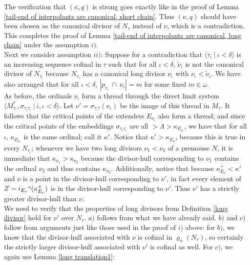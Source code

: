 \documentclass[12pt]{article}
\begin{document}
The verification that $( \kappa , q)$ is strong goes exactly like in the proof of Lemma \ref{tail-end of interpolants are canonical, short chain}.  Thus $(\kappa , q)$ should have been chosen as the canonical divisor of $N_\tau$ instead of $\nu$, which is a contradiction.  This completes the proof of Lemma \ref{tail-end of interpolants are canonical, long chain} under the assumption $i)$.\\


Next we consider assumption $ii)$: Suppose for a contradiction that $\langle \tau_\iota \ | \ \iota < \delta \rangle$ is an increasing sequence cofinal in $\tau$ such that for all $\iota < \delta$, $\tilde{\nu}_\iota$ is not the canonical divisor of $N_{\tau_\iota}$ because $N_{\tau_\iota}$ has a canonical long divisor $\nu_\iota$ with $\nu_\iota < \tilde{\nu}_\iota$.  We have also arranged that for all $\iota < \delta$, $|p_{\tau_\iota} \ \cap \ \nu_\iota| = m$ for some fixed $m \in \omega$.\\

As before, the ordinals $\nu_\iota$ form a thread through the direct limit system $\langle M^*_{\tau_\iota} , \sigma_{\tau_{\bar{\iota}} \tau_\iota} \ | \ \bar{\iota}, \iota < \delta \rangle$.  Let $\nu' = \sigma_{\tau_\iota \tau} (\nu_\iota)$ be the image of this thread in $M_\tau$.  It follows that the critical points of the extenders $E_{\nu_\iota}$ also form a thread; and since the critical points of the embeddings $\sigma_{\tau_{\bar{\iota}} \tau_\iota}$ are all $> \Lambda > \kappa_{E_{\nu_\iota}}$, we have that for all $\iota$, $\kappa_{E_{\nu_\iota}}$ is the same ordinal; call it $\kappa'$.  Notice that $\kappa' > \kappa_{E_\nu}$, because this is true in every $N_{\tau_\iota}$; whenever we have two long divisors $\nu_1 < \nu_2$ of a premouse $N$, it is immediate that $\kappa_{\nu_1} > \kappa_{\nu_2}$ because the divisor-hull corresponding to $\nu_1$ contains the ordinal $\nu_2$ and thus contains $\kappa_{\nu_2}$.  Additionally, notice that because $\kappa_{E_\nu}^+ < \kappa'$ and $\nu$ is a point in the divisor-hull corresponding to $\nu'$, in fact every element of $Z = i_{E_\nu}`` (\kappa_{E_\nu}^+)$ is in the divisor-hull corresponding to $\nu'$.  Thus $\nu'$ has a strictly greater divisor-hull than $\nu$.\\


We need to verify that the properties of long divisors from Definition \ref{long divisor} hold for $\nu'$ over $N_\tau$.  $a)$ follows from what we have already said.  $b)$ and $c)$ follow from arguments just like those used in the proof of $i)$ above: for $b)$, we know that the divisor-hull associated with $\nu$ is cofinal in $\varrho_n (N_\tau)$, so certainly the strictly larger divisor-hull associated with $\nu'$ is cofinal as well.  For $c)$, we again use Lemma \ref{long translation1}:
\end{document}
